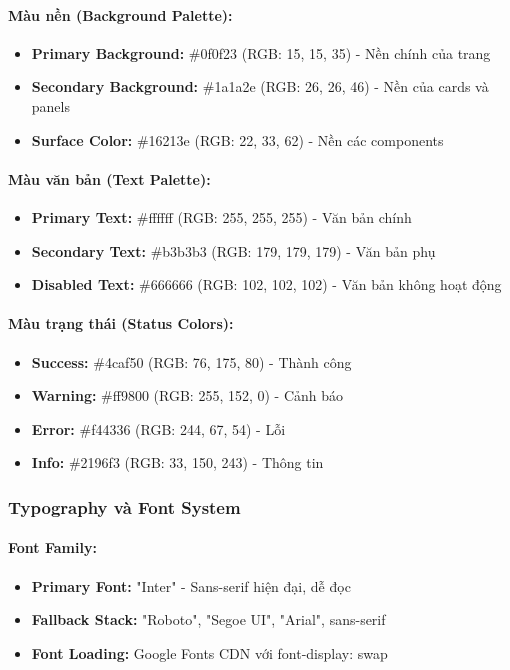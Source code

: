\paragraph{Màu nền (Background Palette):}
\begin{itemize}
    \item \textbf{Primary Background:} \#0f0f23 (RGB: 15, 15, 35) - Nền chính của trang
    \item \textbf{Secondary Background:} \#1a1a2e (RGB: 26, 26, 46) - Nền của cards và panels
    \item \textbf{Surface Color:} \#16213e (RGB: 22, 33, 62) - Nền các components
\end{itemize}

\paragraph{Màu văn bản (Text Palette):}
\begin{itemize}
    \item \textbf{Primary Text:} \#ffffff (RGB: 255, 255, 255) - Văn bản chính
    \item \textbf{Secondary Text:} \#b3b3b3 (RGB: 179, 179, 179) - Văn bản phụ
    \item \textbf{Disabled Text:} \#666666 (RGB: 102, 102, 102) - Văn bản không hoạt động
\end{itemize}

\paragraph{Màu trạng thái (Status Colors):}
\begin{itemize}
    \item \textbf{Success:} \#4caf50 (RGB: 76, 175, 80) - Thành công
    \item \textbf{Warning:} \#ff9800 (RGB: 255, 152, 0) - Cảnh báo
    \item \textbf{Error:} \#f44336 (RGB: 244, 67, 54) - Lỗi
    \item \textbf{Info:} \#2196f3 (RGB: 33, 150, 243) - Thông tin
\end{itemize}

\subsubsection{Typography và Font System}

\paragraph{Font Family:}
\begin{itemize}
    \item \textbf{Primary Font:} "Inter" - Sans-serif hiện đại, dễ đọc
    \item \textbf{Fallback Stack:} "Roboto", "Segoe UI", "Arial", sans-serif
    \item \textbf{Font Loading:} Google Fonts CDN với font-display: swap
\end{itemize}

